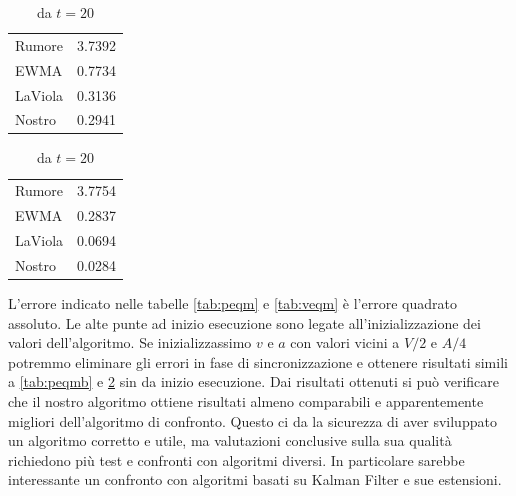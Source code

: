 \begin{table}
    \caption{Velocità: Errore quadrato medio}
    \label{tab:veqm}
    \centering
    \begin{subtable}{.49\textwidth}
        \caption{da $t=0$}
        \centering
        \begin{tabular}{l r}
            Rumore  & 3.7392 \\
            EWMA    & 0.7734 \\
            LaViola & 0.3136 \\
            Nostro  & 0.2941 \\
        \end{tabular}
    \end{subtable}
    \hfill
    \begin{subtable}{.49\textwidth}
        \caption{ da $t=20$ }
        \label{tab:veqmb}
        \centering
        \begin{tabular}{l r}
            Rumore  & 3.7754 \\
            EWMA    & 0.2837 \\
            LaViola & 0.0694 \\
            Nostro  & 0.0284 \\
        \end{tabular}
    \end{subtable}
\end{table}

L'errore indicato nelle tabelle \ref{tab:peqm} e \ref{tab:veqm} è l'errore quadrato assoluto.
Le alte punte ad inizio esecuzione sono legate all'inizializzazione dei valori dell'algoritmo.
Se inizializzassimo $v$ e $a$ con valori vicini a $V/2$ e $A/4$ potremmo eliminare gli errori in fase di sincronizzazione e ottenere risultati simili a \ref{tab:peqmb} e \ref{tab:veqmb} sin da inizio esecuzione.
Dai risultati ottenuti si può verificare che il nostro algoritmo ottiene risultati almeno comparabili e apparentemente migliori dell'algoritmo di confronto.
Questo ci da la sicurezza di aver sviluppato un algoritmo corretto e utile, ma valutazioni conclusive sulla sua qualità richiedono più test e confronti con algoritmi diversi.
In particolare sarebbe interessante un confronto con algoritmi basati su Kalman Filter e sue estensioni. 
